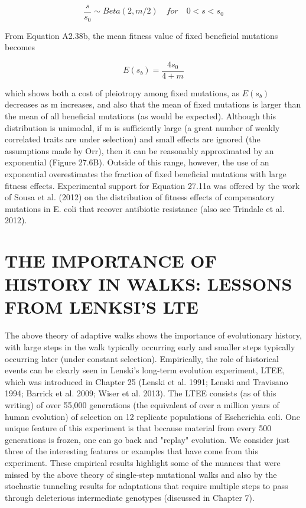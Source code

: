 \documentclass{article}
\begin{document}
\begin{equation}
\frac{s}{s_{0}}\sim Beta(2,m/2)\quad for\quad0<s<s_{0}
\tag{27.11a}
\label{eq:27_11a}
\end{equation}

From Equation A2.38b, the mean fitness value of fixed beneficial mutations becomes

\begin{equation}
E(s_{b})=\frac{4s_{0}}{4+m}
\tag{27.11b}
\label{eq:27_11b}
\end{equation}

which shows both a cost of pleiotropy among fixed mutations, as  $ E(s_b) $ decreases as m increases, and also that the mean of fixed mutations is larger than the mean of all beneficial mutations (as would be expected). Although this distribution is unimodal, if m is sufficiently large (a great number of weakly correlated traits are under selection) and small effects are ignored (the assumptions made by Orr), then it can be reasonably approximated by an exponential (Figure 27.6B). Outside of this range, however, the use of an exponential overestimates the fraction of fixed beneficial mutations with large fitness effects. Experimental support for Equation 27.11a was offered by the work of Sousa et al. (2012) on the distribution of fitness effects of compensatory mutations in E. coli that recover antibiotic resistance (also see Trindale et al. 2012).

\section{THE IMPORTANCE OF HISTORY IN WALKS: LESSONS FROM LENKSI'S LTE}
The above theory of adaptive walks shows the importance of evolutionary history, with large steps in the walk typically occurring early and smaller steps typically occurring later (under constant selection). Empirically, the role of historical events can be clearly seen in Lenski's long-term evolution experiment, LTEE, which was introduced in Chapter 25 (Lenski et al. 1991; Lenski and Travisano 1994; Barrick et al. 2009; Wiser et al. 2013). The LTEE consists (as of this writing) of over 55,000 generations (the equivalent of over a million years of human evolution) of selection on 12 replicate populations of Escherichia coli. One unique feature of this experiment is that because material from every 500 generations is frozen, one can go back and "replay" evolution. We consider just three of the interesting features or examples that have come from this experiment. These empirical results highlight some of the nuances that were missed by the above theory of single-step mutational walks and also by the stochastic tunneling results for adaptations that require multiple steps to pass through deleterious intermediate genotypes (discussed in Chapter 7).
\end{document}
